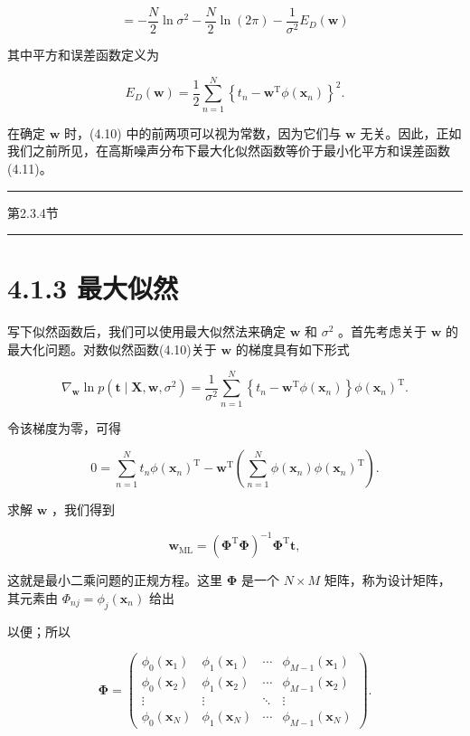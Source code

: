 \documentclass[10pt]{article}
\newcommand{\HRule}{\begin{center}\rule{0.9\linewidth}{0.2mm}\end{center}}
\begin{document}
\[
=  - \frac{N}{2}\ln {\sigma }^{2} - \frac{N}{2}\ln \left( {2\pi }\right)  - \frac{1}{{\sigma }^{2}}{E}_{D}\left( \mathbf{w}\right)  \tag{4.10}
\]

其中平方和误差函数定义为

\[
{E}_{D}\left( \mathbf{w}\right)  = \frac{1}{2}\mathop{\sum }\limits_{{n = 1}}^{N}{\left\{  {t}_{n} - {\mathbf{w}}^{\mathrm{T}}\phi \left( {\mathbf{x}}_{n}\right) \right\}  }^{2}. \tag{4.11}
\]

在确定 \(\mathbf{w}\) 时，(4.10) 中的前两项可以视为常数，因为它们与 \(\mathbf{w}\) 无关。因此，正如我们之前所见，在高斯噪声分布下最大化似然函数等价于最小化平方和误差函数 (4.11)。

\HRule

第2.3.4节

\HRule

\section*{4.1.3 最大似然}

写下似然函数后，我们可以使用最大似然法来确定 \(\mathbf{w}\) 和 \({\sigma }^{2}\) 。首先考虑关于 \(\mathbf{w}\) 的最大化问题。对数似然函数(4.10)关于 \(\mathbf{w}\) 的梯度具有如下形式

\[
{\nabla }_{\mathbf{w}}\ln p\left( {\mathbf{t} \mid  \mathbf{X},\mathbf{w},{\sigma }^{2}}\right)  = \frac{1}{{\sigma }^{2}}\mathop{\sum }\limits_{{n = 1}}^{N}\left\{  {{t}_{n} - {\mathbf{w}}^{\mathrm{T}}\phi \left( {\mathbf{x}}_{n}\right) }\right\}  \phi {\left( {\mathbf{x}}_{n}\right) }^{\mathrm{T}}. \tag{4.12}
\]

令该梯度为零，可得

\[
0 = \mathop{\sum }\limits_{{n = 1}}^{N}{t}_{n}\phi {\left( {\mathbf{x}}_{n}\right) }^{\mathrm{T}} - {\mathbf{w}}^{\mathrm{T}}\left( {\mathop{\sum }\limits_{{n = 1}}^{N}\phi \left( {\mathbf{x}}_{n}\right) \phi {\left( {\mathbf{x}}_{n}\right) }^{\mathrm{T}}}\right) . \tag{4.13}
\]

求解 \(\mathbf{w}\) ，我们得到

\[
{\mathbf{w}}_{\mathrm{{ML}}} = {\left( {\mathbf{\Phi }}^{\mathrm{T}}\mathbf{\Phi }\right) }^{-1}{\mathbf{\Phi }}^{\mathrm{T}}\mathbf{t}, \tag{4.14}
\]

这就是最小二乘问题的正规方程。这里 \(\mathbf{\Phi }\) 是一个 \(N \times  M\) 矩阵，称为设计矩阵，其元素由 \({\Phi }_{nj} = {\phi }_{j}\left( {\mathbf{x}}_{n}\right)\) 给出

以便；所以

\[
\mathbf{\Phi } = \left( \begin{matrix} {\phi }_{0}\left( {\mathbf{x}}_{1}\right) & {\phi }_{1}\left( {\mathbf{x}}_{1}\right) & \cdots & {\phi }_{M - 1}\left( {\mathbf{x}}_{1}\right) \\  {\phi }_{0}\left( {\mathbf{x}}_{2}\right) & {\phi }_{1}\left( {\mathbf{x}}_{2}\right) & \cdots & {\phi }_{M - 1}\left( {\mathbf{x}}_{2}\right) \\  \vdots & \vdots &  \ddots  & \vdots \\  {\phi }_{0}\left( {\mathbf{x}}_{N}\right) & {\phi }_{1}\left( {\mathbf{x}}_{N}\right) & \cdots & {\phi }_{M - 1}\left( {\mathbf{x}}_{N}\right)  \end{matrix}\right) . \tag{4.15}
\]
\end{document}
